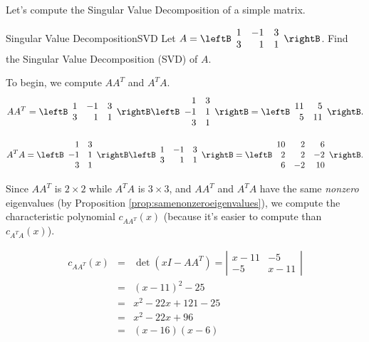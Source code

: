 Let's compute the Singular Value Decomposition of a simple matrix.

\begin{example}{Singular Value Decomposition}{SVD}
Let 
$A=\leftB\begin{array}{rrr} 1 & -1 & 3 \\ 3 & 1 & 1 \end{array}\rightB$.
Find the Singular Value Decomposition (SVD) of $A$.
\end{example}

\begin{solution}
To begin, we compute $AA^T$ and $A^TA$.
\[ AA^T = \leftB\begin{array}{rrr} 1 & -1 & 3 \\ 3 & 1 & 1 \end{array}\rightB
\leftB\begin{array}{rr} 1 & 3 \\ -1 & 1 \\ 3 & 1  \end{array}\rightB
= \leftB\begin{array}{rr} 11 & 5 \\ 5 & 11  \end{array}\rightB.\]

\[ A^TA = \leftB\begin{array}{rr} 1 & 3 \\ -1 & 1 \\ 3 & 1  \end{array}\rightB
\leftB\begin{array}{rrr} 1 & -1 & 3 \\ 3 & 1 & 1 \end{array}\rightB
= \leftB\begin{array}{rrr} 10 & 2 & 6 \\ 2 & 2 & -2\\
6 & -2 & 10 \end{array}\rightB.\]

Since $AA^T$ is $2\times 2$ while $A^T A$ is $3\times 3$, and $AA^T$
and $A^TA$ have the same {\em nonzero} eigenvalues (by Proposition
\ref{prop:samenonzeroeigenvalues}), we compute the characteristic polynomial  $c_{AA^T}(x)$ (because it's
easier to compute than $c_{A^TA}(x)$).

\begin{eqnarray*}
c_{AA^T}(x)& = &\det(xI-AA^T)= \left|\begin{array}{cc}
x-11 & -5 \\ -5 & x-11 \end{array}\right|\\
& = &(x-11)^2 - 25 \\
& = & x^2-22x+121-25\\
& = & x^2-22x+96\\
& = & (x-16)(x-6)
\end{eqnarray*}


\end{solution}
